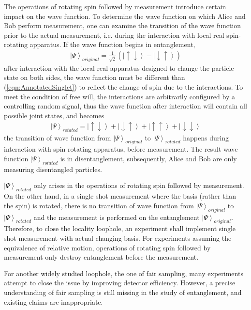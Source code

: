\documentclass[prd,showpacs,twocolumn]{revtex4-1}
\begin{document}
The operations of rotating spin followed by measurement introduce certain impact on the wave function. To determine the wave function on which Alice and Bob perform measurement, one can examine the transition of the wave function prior to the actual measurement, i.e. during the interaction with local real spin-rotating apparatus. If the wave function begins in entanglement,
\begin{eqnarray}
\left| \Psi\right >_{original}=\frac{1}{\sqrt{2}}(\left|\uparrow\downarrow\right>-\left|\downarrow\uparrow\right>)
\label{eqn:AnnotatedSinglet}
\end{eqnarray}
after interaction with the local real apparatus designed to change the particle state on both sides, the wave function must be different than (\ref{eqn:AnnotatedSinglet}) to reflect the change of spin due to the interactions. To meet the condition of free will, the interactions are arbitrarily configured by a controlling random signal, thus the wave function after interaction will contain all possible joint states, and becomes
\begin{eqnarray}
\left| \Psi\right >_{rotated}=\left|\uparrow\downarrow\right>+\left|\downarrow\uparrow\right> + \left|\uparrow\uparrow\right> + \left|\downarrow\downarrow\right>
\label{eqn:Disturbed}
\end{eqnarray}
the transition of wave function from $\left| \Psi\right >_{original}$ to $\left| \Psi\right >_{rotated}$ happens during interaction with spin rotating apparatus, before measurement. The result wave function $\left| \Psi\right >_{rotated}$ is in disentanglement, subsequently, Alice and Bob are only measuring disentangled particles.

$\left| \Psi\right >_{rotated}$ only arises in the operations of rotating spin followed by measurement. On the other hand, in a single shot measurement where the basis (rather than the spin) is rotated, there is no transition of wave function from $\left| \Psi\right >_{original}$ to $\left| \Psi\right >_{rotated}$ and the measurement is performed on the entanglement $\left| \Psi\right >_{original}$. Therefore, to close the locality loophole, an experiment shall implement single shot measurement with actual changing basis. For experiments assuming the equivalence of relative motion, operations of rotating spin followed by measurement only destroy entanglement before the measurement.

For another widely studied loophole, the one of fair sampling, many experiments attempt to close the issue by improving detector efficiency\cite{Giustina,Shalm,Hensen}. However, a precise understanding of fair sampling is still missing in the study of entanglement, and existing claims are inappropriate.
\end{document}
